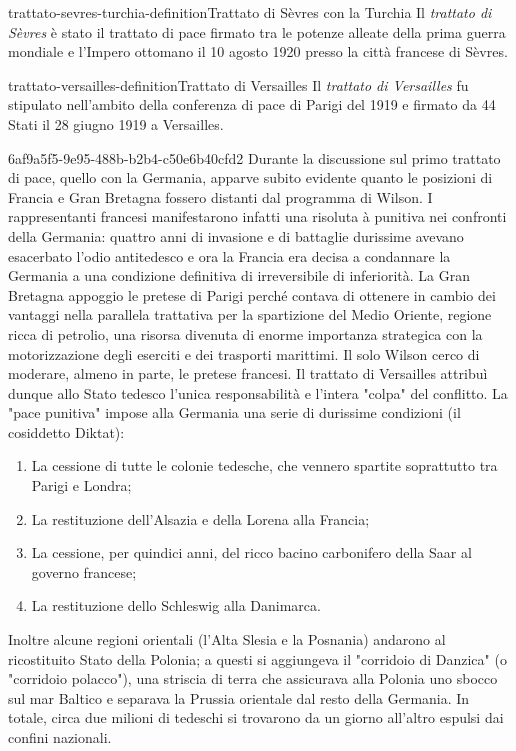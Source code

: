 \documentclass[preview]{standalone}
\begin{document}
\begin{snippetdefinition}{trattato-sevres-turchia-definition}{Trattato di Sèvres con la Turchia}
    Il \textit{trattato di Sèvres} è stato il trattato di pace firmato
    tra le potenze alleate della prima guerra mondiale e l'Impero ottomano il
    10 agosto 1920 presso la città francese di Sèvres.
\end{snippetdefinition}

\begin{snippetdefinition}{trattato-versailles-definition}{Trattato di Versailles}
    Il \textit{trattato di Versailles} fu stipulato nell'ambito
    della conferenza di pace di Parigi del 1919 e firmato da 44
    Stati il 28 giugno 1919 a Versailles.
\end{snippetdefinition}

\begin{snippet}{6af9a5f5-9e95-488b-b2b4-c50e6b40cfd2}
    Durante la discussione sul primo trattato di pace, quello con la Germania, apparve subito
    evidente quanto le posizioni di Francia e Gran Bretagna fossero distanti dal programma di
    Wilson. I rappresentanti francesi manifestarono infatti una risoluta à punitiva nei
    confronti della Germania: quattro anni di invasione e di battaglie durissime avevano esacerbato
    l'odio antitedesco e ora la Francia era decisa a condannare la Germania a una condizione
    definitiva di irreversibile di inferiorità.
    La Gran Bretagna appoggio le pretese di Parigi perché contava di ottenere in cambio dei
    vantaggi nella parallela trattativa per la spartizione del Medio Oriente, regione ricca di petrolio,
    una risorsa divenuta di enorme importanza strategica con la motorizzazione degli eserciti e dei
    trasporti marittimi. Il solo Wilson cerco di moderare, almeno in parte, le pretese francesi. Il
    trattato di Versailles attribuì dunque allo Stato tedesco l'unica responsabilità e l'intera "colpa"
    del conflitto. La "pace punitiva" impose alla Germania una serie di durissime condizioni (il
    cosiddetto Diktat):
    \begin{enumerate}
        \item La cessione di tutte le colonie tedesche, che vennero spartite soprattutto tra Parigi e
        Londra;
        \item La restituzione dell'Alsazia e della Lorena alla Francia;
        \item La cessione, per quindici anni, del ricco bacino carbonifero della Saar al governo
        francese;
        \item La restituzione dello Schleswig alla Danimarca.
    \end{enumerate}
    Inoltre alcune regioni orientali (l'Alta Slesia e la Posnania) andarono al ricostituito Stato della
    Polonia; a questi si aggiungeva il "corridoio di Danzica" (o "corridoio polacco"), una striscia di
    terra che assicurava alla Polonia uno sbocco sul mar Baltico e separava la Prussia orientale dal
    resto della Germania.
    In totale, circa due milioni di tedeschi si trovarono da un giorno all'altro espulsi dai confini
    nazionali.
    

\end{snippet}
\end{document}

